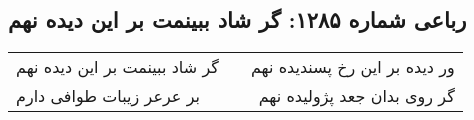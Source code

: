 \begin{center}
\section*{رباعی شماره ۱۲۸۵: گر شاد ببینمت بر این دیده نهم}
\label{sec:1285}
\begin{longtable}{l p{0.5cm} r}
گر شاد ببینمت بر این دیده نهم
&&
ور دیده بر این رخ پسندیده نهم
\\
بر عرعر زیبات طوافی دارم
&&
گر روی بدان جعد پژولیده نهم
\\
\end{longtable}
\end{center}
